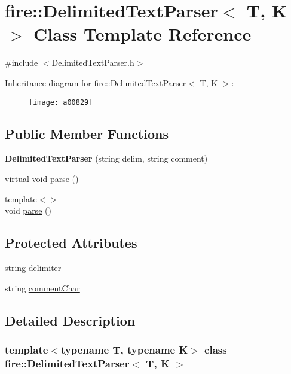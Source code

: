 \hypertarget{a00829}{}\section{fire\+:\+:Delimited\+Text\+Parser$<$ T, K $>$ Class Template Reference}
\label{a00829}


{\ttfamily \#include $<$Delimited\+Text\+Parser.\+h$>$}

Inheritance diagram for fire\+:\+:Delimited\+Text\+Parser$<$ T, K $>$\+:\begin{figure}[H]
\begin{center}
\leavevmode
\texttt{[image: a00829]}
\end{center}
\end{figure}
\subsection*{Public Member Functions}
\begin{DoxyCompactItemize}
\item 
\mbox{\label{a00829_aa1f041ebbf0bf72145e8bd20bf95f3f4}} 
{\bfseries Delimited\+Text\+Parser} (string delim, string comment)
\item 
virtual void \hyperlink{a00829_a686df5548771cae833d5e721442a821a}{parse} ()
\item 
{\footnotesize template$<$$>$ }\\void \hyperlink{a00829_a773fa7ed28cb9d8c384ad94bd81fc93f}{parse} ()
\end{DoxyCompactItemize}
\subsection*{Protected Attributes}
\begin{DoxyCompactItemize}
\item 
string \hyperlink{a00829_ac817fc333b53611a41f446977461bdbf}{delimiter}
\item 
string \hyperlink{a00829_acdd7b27b8109ed41e7d9bc5e6de72e93}{comment\+Char}
\end{DoxyCompactItemize}


\subsection{Detailed Description}
\subsubsection*{template$<$typename T, typename K$>$\newline
class fire\+::\+Delimited\+Text\+Parser$<$ T, K $>$}

